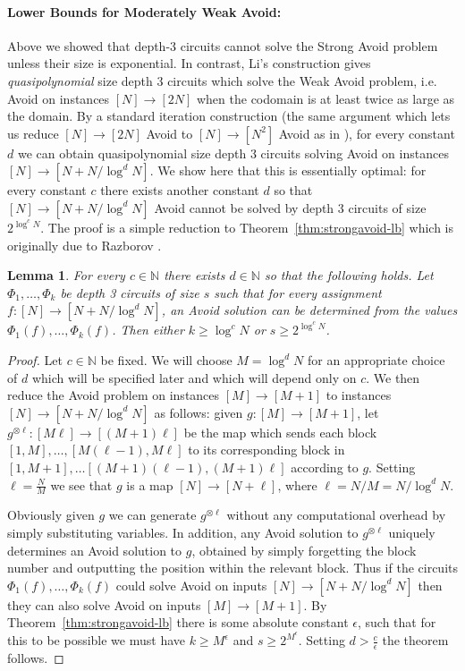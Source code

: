 \documentclass[11pt]{article}
\newtheorem{lemma}{Lemma}
\begin{document}
\paragraph{Lower Bounds for Moderately Weak Avoid:}
Above we showed that depth-3 circuits cannot solve the Strong Avoid problem unless their size is exponential. In contrast, Li's construction gives \emph{quasipolynomial} size depth 3 circuits which solve the Weak Avoid problem, i.e. Avoid on instances $[N] \to [2N]$ when the codomain is at least twice as large as the domain. By a standard iteration construction (the same argument which lets us reduce $[N] \to [2N]$ Avoid to $[N] \to [N^2]$ Avoid as in \cite{Korten}), for every constant $d$ we can obtain quasipolynomial size depth 3 circuits solving Avoid on instances $[N] \to [N+N/\log^dN]$. We show here that this is essentially optimal: for every constant $c$ there exists another constant $d$ so that $[N] \to [N+N/\log^dN]$ Avoid cannot be solved by depth 3 circuits of size $2^{\log^cN}$. The proof is a simple reduction to Theorem~\ref{thm:strongavoid-lb} which is originally due to Razborov \cite{raz-talk}.
\begin{lemma}\label{lem:php-lb-larger-stretch}
For every $c \in \mathbb{N}$ there exists $d \in \mathbb{N}$ so that the following holds. Let $\Phi_1,\ldots,\Phi_k$ be depth 3 circuits of size $s$ such that for every assignment $f:[N] \to [N+N/\log^dN]$, an Avoid solution can be determined from the values $\Phi_1(f),\ldots,\Phi_k(f)$. Then either $k \geq \log^cN$ or $s \geq 2^{\log^c N}$.
\end{lemma}
\begin{proof}
Let $c \in \mathbb{N}$ be fixed. We will choose $M = \log^dN$ for an appropriate choice of $d$ which will be specified later and which will depend only on $c$. We then reduce the Avoid problem on instances $[M] \to [M+1]$ to instances $[N] \to [N+N/\log^dN]$ as follows: given $g: [M] \to [M+1]$, let $g^{\otimes \ell}: [M\ell] \to [(M+1)\ell]$ be the map which sends each block $[1,M], \ldots, [M(\ell-1), M\ell]$ to its corresponding block in $[1,M+1], \ldots [(M+1)(\ell-1),(M+1)\ell]$ according to $g$. Setting $\ell = \frac{N}{M}$ we see that $g$ is a map $[N] \to [N + \ell]$, where $\ell = N/M = N/\log^d N$. 

Obviously given $g$ we can generate $g^{\otimes \ell}$ without any computational overhead by simply substituting variables. In addition, any Avoid solution to $g^{\otimes \ell}$ uniquely determines an Avoid solution to $g$, obtained by simply forgetting the block number and outputting the position within the relevant block. Thus if the circuits $\Phi_1(f),\ldots,\Phi_k(f)$ could solve Avoid on inputs $[N] \to [N+N/\log^dN]$ then they can also solve Avoid on inputs $[M] \to [M+1]$. By Theorem~\ref{thm:strongavoid-lb} there is some absolute constant $\epsilon$, such that for this to be possible we must have $k \geq M^{\epsilon}$ and $s \geq 2^{M^{\epsilon}}$. Setting $d > \frac{c}{\epsilon}$ the theorem follows.
\end{proof}
\end{document}
